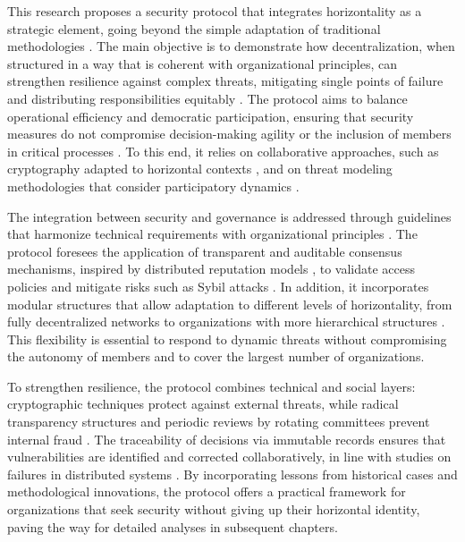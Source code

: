 This research proposes a security protocol that integrates horizontality as a
strategic element, going beyond the simple adaptation of traditional
methodologies \cite{Colbac}. The main objective is to demonstrate how
decentralization, when structured in a way that is coherent with organizational
principles, can strengthen resilience against complex threats, mitigating single
points of failure and distributing responsibilities equitably
\cite{ThreatModelingdesigningForSecurity}. The protocol aims to balance
operational efficiency and democratic participation, ensuring that security
measures do not compromise decision-making agility or the inclusion of members
in critical processes \cite{Reputation-basedDAO}. To this end, it relies on
collaborative approaches, such as cryptography adapted to horizontal contexts
\cite{Colbac}, and on threat modeling methodologies that consider participatory
dynamics \cite{ParticipatoryThreatModelling}.

The integration between security and governance is addressed through guidelines
that harmonize technical requirements with organizational principles
\cite{ParticipatoryThreatModelling}. The protocol foresees the application of
transparent and auditable consensus mechanisms, inspired by distributed
reputation models \cite{Reputation-basedDAO}, to validate access policies and
mitigate risks such as Sybil attacks \cite{MitigationSybilAttack}. In addition,
it incorporates modular structures that allow adaptation to different levels of
horizontality, from fully decentralized networks to organizations with more
hierarchical structures \cite{Colbac}. This flexibility is essential to respond
to dynamic threats without compromising the autonomy of members and to cover the
largest number of organizations.

To strengthen resilience, the protocol combines technical and social layers:
cryptographic techniques protect against external threats, while radical
transparency structures and periodic reviews by rotating committees prevent
internal fraud \cite{EverydayRevolutions}. The traceability of decisions via
immutable records ensures that vulnerabilities are identified and corrected
collaboratively, in line with studies on failures in distributed systems
\cite{Reputation-basedDAO}. By incorporating lessons from historical cases and
methodological innovations, the protocol offers a practical framework for
organizations that seek security without giving up their horizontal identity,
paving the way for detailed analyses in subsequent chapters.

